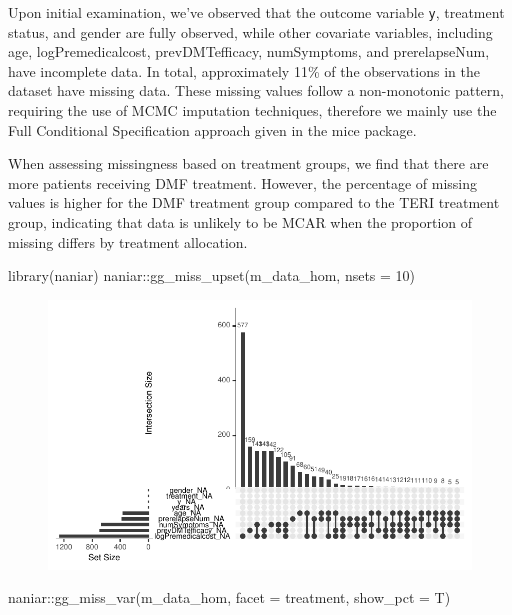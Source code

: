 \documentclass[
  letterpaper,
  DIV=11,
  numbers=noendperiod]{scrreprt}
\newenvironment{Shaded}{\begin{snugshade}}{\end{snugshade}}
\newcommand{\AttributeTok}[1]{\textcolor[rgb]{0.40,0.45,0.13}{#1}}
\newcommand{\DecValTok}[1]{\textcolor[rgb]{0.68,0.00,0.00}{#1}}
\newcommand{\FunctionTok}[1]{\textcolor[rgb]{0.28,0.35,0.67}{#1}}
\newcommand{\NormalTok}[1]{\textcolor[rgb]{0.00,0.23,0.31}{#1}}
\newcommand{\SpecialCharTok}[1]{\textcolor[rgb]{0.37,0.37,0.37}{#1}}
\begin{document}
Upon initial examination, we've observed that the outcome variable
\texttt{y}, treatment status, and gender are fully observed, while other
covariate variables, including age, logPremedicalcost, prevDMTefficacy,
numSymptoms, and prerelapseNum, have incomplete data. In total,
approximately 11\% of the observations in the dataset have missing data.
These missing values follow a non-monotonic pattern, requiring the use
of MCMC imputation techniques, therefore we mainly use the Full
Conditional Specification approach given in the mice package.

When assessing missingness based on treatment groups, we find that there
are more patients receiving DMF treatment. However, the percentage of
missing values is higher for the DMF treatment group compared to the
TERI treatment group, indicating that data is unlikely to be MCAR when
the proportion of missing differs by treatment allocation.

\begin{Shaded}
\begin{Highlighting}[]
\FunctionTok{library}\NormalTok{(naniar)}
\NormalTok{naniar}\SpecialCharTok{::}\FunctionTok{gg\_miss\_upset}\NormalTok{(m\_data\_hom, }\AttributeTok{nsets =} \DecValTok{10}\NormalTok{)}
\end{Highlighting}
\end{Shaded}

\begin{figure}[H]

{\centering \includegraphics{chapter_09_files/figure-pdf/hom miss exploration-1.pdf}

}

\end{figure}

\begin{Shaded}
\begin{Highlighting}[]
\NormalTok{naniar}\SpecialCharTok{::}\FunctionTok{gg\_miss\_var}\NormalTok{(m\_data\_hom, }\AttributeTok{facet =}\NormalTok{ treatment, }\AttributeTok{show\_pct =}\NormalTok{ T)}
\end{Highlighting}
\end{Shaded}
\end{document}
